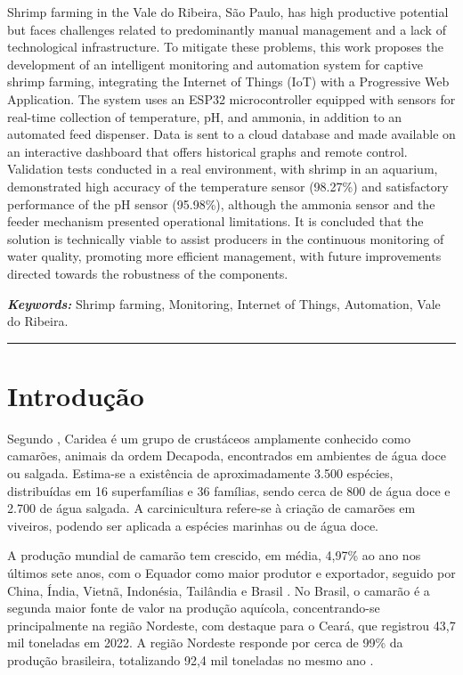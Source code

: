 \documentclass[11pt,a4paper]{article}
\begin{document}
Shrimp farming in the Vale do Ribeira, São Paulo, has high productive potential but faces challenges related to predominantly manual management and a lack of technological infrastructure. To mitigate these problems, this work proposes the development of an intelligent monitoring and automation system for captive shrimp farming, integrating the Internet of Things (IoT) with a Progressive Web Application. The system uses an ESP32 microcontroller equipped with sensors for real-time collection of temperature, pH, and ammonia, in addition to an automated feed dispenser. Data is sent to a cloud database and made available on an interactive dashboard that offers historical graphs and remote control. Validation tests conducted in a real environment, with shrimp in an aquarium, demonstrated high accuracy of the temperature sensor (98.27\%) and satisfactory performance of the pH sensor (95.98\%), although the ammonia sensor and the feeder mechanism presented operational limitations. It is concluded that the solution is technically viable to assist producers in the continuous monitoring of water quality, promoting more efficient management, with future improvements directed towards the robustness of the components.

\vspace{0.3cm}
\noindent\textit{\textbf{Keywords:}} Shrimp farming, Monitoring, Internet of Things, Automation, Vale do Ribeira.

\vspace{0.5cm}
\noindent\rule{\textwidth}{0.5pt}
\vspace{0.5cm}

\section{Introdução}

Segundo \cite{bertini2021}, Caridea é um grupo de crustáceos amplamente conhecido como camarões, animais da ordem Decapoda, encontrados em ambientes de água doce ou salgada. Estima-se a existência de aproximadamente 3.500 espécies, distribuídas em 16 superfamílias e 36 famílias, sendo cerca de 800 de água doce e 2.700 de água salgada. A carcinicultura refere-se à criação de camarões em viveiros, podendo ser aplicada a espécies marinhas ou de água doce.

A produção mundial de camarão tem crescido, em média, 4,97\% ao ano nos últimos sete anos, com o Equador como maior produtor e exportador, seguido por China, Índia, Vietnã, Indonésia, Tailândia e Brasil \cite{Rocha2023}. No Brasil, o camarão é a segunda maior fonte de valor na produção aquícola, concentrando-se principalmente na região Nordeste, com destaque para o Ceará, que registrou 43,7 mil toneladas em 2022. A região Nordeste responde por cerca de 99\% da produção brasileira, totalizando 92,4 mil toneladas no mesmo ano \cite{Ximenes2023}.
\end{document}
